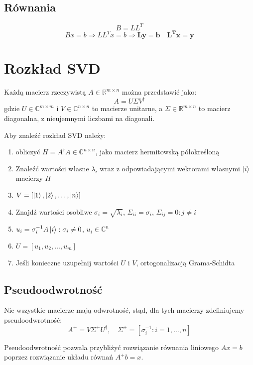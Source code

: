 \documentclass{../notatki}
\begin{document}
\subsection{Równania}

$$
B = LL^T
$$
$$
Bx = b \Rightarrow LL^Tx = b \Rightarrow \mathbf{Ly = b \quad L^Tx = y}
$$

\section{Rozkład SVD}

Każdą macierz rzeczywistą $A \in \mathbb{R}^{m \times n}$ można
przedstawić jako:
$$
A = U \Sigma V^\dag
$$
gdzie $U \in \mathbb{C}^{m\times m}$ i $V \in
\mathbb{C}^{n \times n}$ to macierze unitarne, a $\Sigma \in
\mathbb{R}^{m \times n}$ to macierz diagonalna, z nieujemnymi
liczbami na diagonali.

Aby znaleźć rozkład SVD należy:
\begin{enumerate}
  \item obliczyć $H = A^\dag A \in \mathbb{C}^{n \times n}$, jako macierz
    hermitowską półokreśloną
  \item Znaleźć wartości własne $\lambda_i$ wraz z odpowiadającymi
    wektorami własnymi $\ket{i}$ macierzy $H$
  \item $V = \left[\ket{1}, \ket{2}, \dots, \ket{n}\right]$
  \item Znajdź wartości osobliwe $\sigma_i = \sqrt{\lambda_i}$,
    $\Sigma_{ii} = \sigma_i$, $\Sigma_{ij} = 0 : j \neq i$
  \item $u_i = \sigma_i^{-1} A \ket{i} : \sigma_i \neq 0$, $u_i \in
    \mathbb{C}^n$
  \item $U = \left[u_1, u_2, \dots, u_m\right]$
  \item Jeśli konieczne uzupełnij wartości $U$ i $V$, ortogonalizacją
    Grama-Schidta
\end{enumerate}

\subsection{Pseudoodwrotność}

Nie wszystkie macierze mają odwrotność, stąd, dla tych macierzy
zdefiniujemy pseudoodwrotność:
$$
A^+ = V \Sigma^+ U^\dag, \quad \Sigma^+ = \left[\sigma_i^{-1} : i =
1, \dots, n\right]
$$

Pseudoodwrotność pozwala przybliżyć rozwiązanie równania liniowego
$Ax = b$ poprzez rozwiązanie układu równań $A^+ b = x$.
\end{document}
